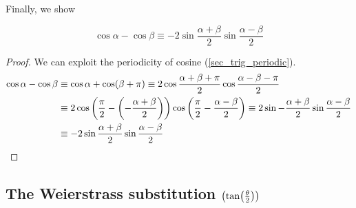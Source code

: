 Finally, we show
\begin{theorem}
\begin{equation*}
\cos \alpha - \cos \beta \equiv
 -2 \sin \frac{\alpha + \beta} 2 \sin \frac{\alpha - \beta} 2
\end{equation*}
\end{theorem}
\begin{proof}
We can exploit the periodicity of cosine (\ref{sec_trig_periodic}).
\begin{align*}
 \cos \alpha - \cos \beta &\equiv
 \cos \alpha + \cos (\beta + \pi)  \equiv
 2 \cos \frac{\alpha + \beta + \pi} 2 \cos \frac {\alpha - \beta - \pi} 2
 \\&\equiv
 2 \cos \pqty{\frac \pi 2 - \pqty{-\frac{\alpha + \beta} 2}}
   \cos \pqty{\frac \pi 2 - \frac{\alpha - \beta} 2} \equiv
 2 \sin -\frac{\alpha + \beta} 2 \sin \frac{\alpha - \beta} 2 \\&\equiv
 -2 \sin \frac{\alpha + \beta} 2 \sin \frac{\alpha - \beta} 2 \qedhere
\end{align*}
\end{proof}

\subsection[The Weierstrass substitution
            \texorpdfstring{(\(\tan(\theta / 2)\))}{(tangent half-angle)}]
   {The Weierstrass substitution \boldmath\(\pqty{\tan(\frac \theta 2)}\)}

